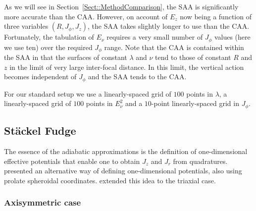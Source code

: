 \documentclass[useAMS,usenatbib,fleqn,a4paper]{mn2e}
\begin{document}
As we will see in Section~\ref{Sect::MethodComparison}, the SAA is
significantly more accurate than the CAA. However, on account of $E_z$ now
being a function of three variables $(R,J_\phi,J_z)$, the SAA takes slightly
longer to use than the CAA. Fortunately, the tabulation of $E_\nu$ requires a very
small number of $J_\phi$ values (here we use ten) over the required $J_\phi$
range. Note that the CAA is contained within the SAA in that the surfaces of
constant $\lambda$ and $\nu$ tend to those of constant $R$ and $z$ in the
limit of very large inter-focal distance. In this limit, the vertical action
becomes independent of $J_\phi$ and the SAA tends to the CAA.

For our standard setup we use a linearly-spaced grid of $100$ points in $\lambda$, a linearly-spaced grid of $100$ points in $E_\nu^2$ and a $10$-point linearly-spaced grid in $J_\phi$.

\subsection{St\"ackel Fudge}\label{Method::SF}

The essence of the adiabatic approximations is the definition of
one-dimensional effective potentials that enable one to obtain $J_z$ and
$J_r$ from quadratures.  \cite{Binney2012} presented an alternative way of
defining one-dimensional potentials, also using prolate spheroidal
coordinates. \cite{SandersBinney2015} extended this idea  to the triaxial
case.

\subsubsection{Axisymmetric case}\label{Method::SF_Axi} 
\end{document}
